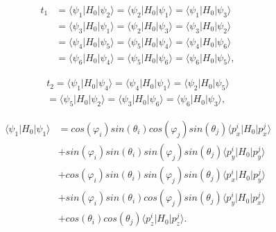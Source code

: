 \begin{equation*}
  \begin{split}
    t_1 &= \langle \psi_1 | H_0 |  \psi_2 \rangle = \langle \psi_2 | H_0 |  \psi_1 \rangle = \langle \psi_1 | H_0 |  \psi_3 \rangle \\
        &= \langle \psi_3 | H_0 |  \psi_1 \rangle = \langle \psi_2 | H_0 |  \psi_3 \rangle = \langle \psi_3 | H_0 |  \psi_2 \rangle \\
        &= \langle \psi_4 | H_0 |  \psi_5 \rangle = \langle \psi_5 | H_0 |  \psi_4 \rangle = \langle \psi_4 | H_0 |  \psi_6 \rangle \\
        &= \langle \psi_6 | H_0 |  \psi_4 \rangle = \langle \psi_5 | H_0 |  \psi_6 \rangle = \langle \psi_6 | H_0 |  \psi_5 \rangle,
  \end{split}
\end{equation*}

\begin{equation*}
  \begin{split}
    t_2  = \langle \psi_1 | H_0 |  \psi_4 \rangle = \langle \psi_4 | H_0 |  \psi_1 \rangle = \langle \psi_2 | H_0 |  \psi_5 \rangle \\
        = \langle \psi_5 | H_0 |  \psi_2 \rangle = \langle \psi_3 | H_0 |  \psi_6 \rangle = \langle \psi_6 | H_0 |  \psi_3 \rangle,
  \end{split}
\end{equation*}

\begin{equation*}
  \begin{split}
  \langle \psi_1 | H_0 |  \psi_1 \rangle &= cos(\varphi_i)sin(\theta_i)cos(\varphi_j)sin(\theta_j) \langle p_x^i | H_0 | p_x^j \rangle  \\
  &+ sin(\varphi_i)sin(\theta_i)sin(\varphi_j)sin(\theta_j) \langle p_y^i | H_0 | p_y^j \rangle \\
  &+ cos(\varphi_i)sin(\theta_i)sin(\varphi_j)sin(\theta_j) \langle p_x^i | H_0 | p_y^j \rangle \\
  &+ sin(\varphi_i)sin(\theta_i)cos(\varphi_j)sin(\theta_j) \langle p_y^i | H_0 | p_x^j \rangle \\
  &+ cos(\theta_i)cos(\theta_j) \langle p_z^i | H_0 | p_z^j \rangle.
  \end{split}
\end{equation*}

